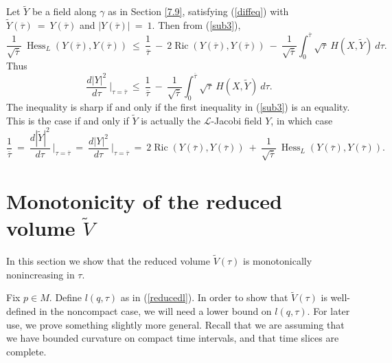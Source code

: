\documentclass[12pt]{amsart}
\newcommand{\Hess}{\operatorname{Hess}}
\newcommand{\Ric}{\operatorname{Ric}}
\numberwithin{equation}{section}
\theoremstyle{plain}
\theoremstyle{definition}
\theoremstyle{remark}
\begin{document}
Let $\tilde{Y}$ be a field along $\gamma$ as in Section \ref{7.9},
satisfying (\ref{diffeq}) with $\tilde{Y}(\overline{\tau}) \: = \:
{Y}(\overline{\tau})$ and $|{Y}(\overline{\tau})| \: = \: 1$.
Then from (\ref{sub3}),
\begin{equation}
\frac{1}{\sqrt{\overline{\tau}}} \:
\Hess_L(Y(\overline{\tau}), Y(\overline{\tau})) \: \le \:
\frac{1}{\overline{\tau}} \: - \:
2 \Ric(Y(\overline{\tau}),Y(\overline{\tau})) \: - \: 
\frac{1}{\sqrt{\overline{\tau}}} \int_0^{\overline{\tau}}
\sqrt{\tau} \: H(X, \tilde{Y}) \: d\tau.
\end{equation}
Thus
\begin{equation} \label{dY}
\frac{d |Y|^2}{d\tau} \: \Big|_{\tau = \overline{\tau}} \: \le \: 
\frac{1}{\overline{\tau}} \: - \:
\frac{1}{\sqrt{\overline{\tau}}} \int_0^{\overline{\tau}}
\sqrt{\tau} \: H(X, \tilde{Y}) \: d\tau.
\end{equation}
The inequality is sharp if and only if the first inequality in
(\ref{sub3}) is an equality.
This is the case if and only if $\tilde{Y}$ is actually the
${\mathcal L}$-Jacobi field $Y$, in which case
\begin{equation} \label{sharp}
\frac{1}{\overline{\tau}} \: = \: 
\frac{d |\tilde{Y}|^2}{d\tau} \: \Big|_{\tau = \overline{\tau}} \: = \:
\frac{d |Y|^2}{d\tau} \: \Big|_{\tau = \overline{\tau}}
\: = \:
2 \Ric(Y(\overline{\tau}),Y(\overline{\tau})) \: + \:
\frac{1}{\sqrt{\overline{\tau}}} \:
\Hess_L(Y(\overline{\tau}), Y(\overline{\tau})).
\end{equation}

\section{Monotonicity of 
the reduced volume $\widetilde{V}$} \label{monoV}

In this section we show that the reduced volume $\widetilde{V}(\tau)$ is
monotonically nonincreasing in $\tau$.


Fix $p \in M$. Define $l(q, \tau)$ 
as in (\ref{reducedl}). In order to show that
$\tilde{V}(\tau)$ is well-defined in the noncompact case,
we will need a lower bound on $l(q, \tau)$. For later
use, we prove something slightly more general. Recall
that we are assuming that we have bounded curvature on
compact time intervals,
and that time slices are complete.
\end{document}
